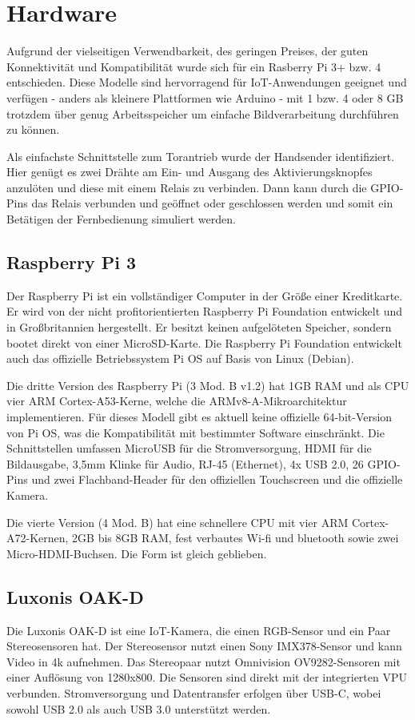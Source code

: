 \section{Hardware}
	Aufgrund der vielseitigen Verwendbarkeit, des geringen Preises, der guten Konnektivität und Kompatibilität wurde sich für ein Rasberry Pi 3+ bzw. 4 entschieden. Diese Modelle sind hervorragend für IoT-Anwendungen geeignet und verfügen - anders als kleinere Plattformen wie Arduino - mit 1 bzw. 4 oder 8 GB trotzdem über genug Arbeitsspeicher um einfache Bildverarbeitung durchführen zu können. \autocite[Vgl.][]{todo}

Als einfachste Schnittstelle zum Torantrieb wurde der Handsender identifiziert. Hier genügt es zwei Drähte am Ein- und Ausgang des Aktivierungsknopfes anzulöten und diese mit einem Relais zu verbinden. Dann kann durch die \ac{GPIO}-Pins das Relais verbunden und geöffnet oder geschlossen werden und somit ein Betätigen der Fernbedienung simuliert werden.


\subsection{Raspberry Pi 3}
Der Raspberry Pi ist ein vollständiger Computer in der Größe einer Kreditkarte. Er wird von der nicht profitorientierten Raspberry Pi Foundation entwickelt und in Großbritannien hergestellt. Er besitzt keinen aufgelöteten Speicher, sondern bootet direkt von einer MicroSD-Karte. Die Raspberry Pi Foundation entwickelt auch das offizielle Betriebssystem Pi OS auf Basis von Linux (Debian).

Die dritte Version des Raspberry Pi (3 Mod. B v1.2) hat 1GB RAM und als CPU vier ARM Cortex-A53-Kerne, welche die ARMv8-A-Mikroarchitektur implementieren. Für dieses Modell gibt es aktuell keine offizielle 64-bit-Version von Pi OS, was die Kompatibilität mit bestimmter Software einschränkt.
Die Schnittstellen umfassen MicroUSB für die Stromversorgung, HDMI für die Bildausgabe, 3,5mm Klinke für Audio, RJ-45 (Ethernet), 4x USB 2.0, 26 \ac{GPIO}-Pins und zwei Flachband-Header für den offiziellen Touchscreen und die offizielle Kamera.

Die vierte Version (4 Mod. B) hat eine schnellere CPU mit vier ARM Cortex-A72-Kernen, 2GB bis 8GB RAM, fest verbautes Wi-fi und bluetooth sowie zwei Micro-HDMI-Buchsen. Die Form ist gleich geblieben.

\subsection{Luxonis OAK-D}
Die Luxonis OAK-D ist eine IoT-Kamera, die einen RGB-Sensor und ein Paar Stereosensoren hat. Der Stereosensor nutzt einen Sony IMX378-Sensor und kann Video in 4k aufnehmen. Das Stereopaar nutzt Omnivision OV9282-Sensoren mit einer Auflösung von 1280x800.
Die Sensoren sind direkt mit der integrierten \ac{VPU} verbunden. Stromversorgung und Datentransfer erfolgen über USB-C, wobei sowohl USB 2.0 als auch USB 3.0 unterstützt werden.

